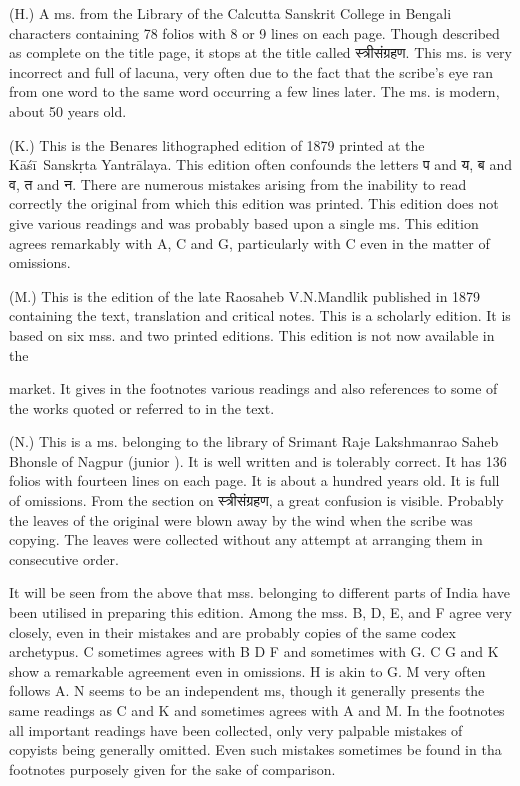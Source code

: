 \documentclass[11pt, openany]{book}
\begin{document}
\hangindent=1.5cm (H.) A ms. from the Library of the Calcutta Sanskrit College in Bengali characters containing 78 folios with 8 or 9 lines on each page. Though described as complete on the title page, it stops at the title called स्त्रीसंग्रहण. This ms. is very incorrect and full of lacuna, very often due to the fact that the scribe's eye ran from one word to the same word occurring a few lines later. The ms. is modern, about 50 years old.

\hangindent=1.5cm (K.) This is the Benares lithographed edition of 1879 printed at the Kāśī\textendash\ Sanskṛta Yantrālaya. This edition often confounds the letters प and य, ब and व, त and न. There are numerous mistakes arising from the inability to read correctly the original from which this edition was printed. This edition does not give various readings and was probably based upon a single ms. This edition agrees remarkably with A, C and G, particularly with C even in the matter of omissions.

\hangindent=1.5cm (M.) This is the edition of the late Raosaheb V.N.Mandlik published in 1879 containing the text, translation and critical notes. This is a scholarly edition. It is based on six mss. and two printed editions. This edition is not now available in the

\newpage

\hangindent=1.5cm \indent \hspace{0.8cm} market. It gives in the footnotes various readings and also references to some of the works quoted or referred to in the text.

\hangindent=1.5cm (N.) This is a ms. belonging to the library of Srimant Raje Lakshmanrao Saheb Bhonsle of Nagpur (junior ). It is well written and is tolerably correct. It has 136 folios with fourteen lines on each page. It is about a hundred years old. It is full of omissions. From the section on स्त्रीसंग्रहण, a great confusion is visible. Probably the leaves of the original were blown away by the wind when the scribe was copying. The leaves were collected without any attempt at arranging them in consecutive order. 

It will be seen from the above that mss. belonging to different parts of India have been utilised in preparing this edition. Among the mss. B, D, E, and F agree very closely, even in their mistakes and are probably copies of the same codex archetypus. C sometimes agrees with B D F and sometimes with G. C G and K show a remarkable agreement even in omissions. H is akin to G. M very often follows A. N seems to be an independent ms, though it generally presents the same readings as C and K and sometimes agrees with A and M. In the footnotes all important readings have been collected, only very palpable mistakes of copyists being generally omitted. Even such mistakes sometimes be found in tha footnotes purposely given for the sake of comparison.
\end{document}
